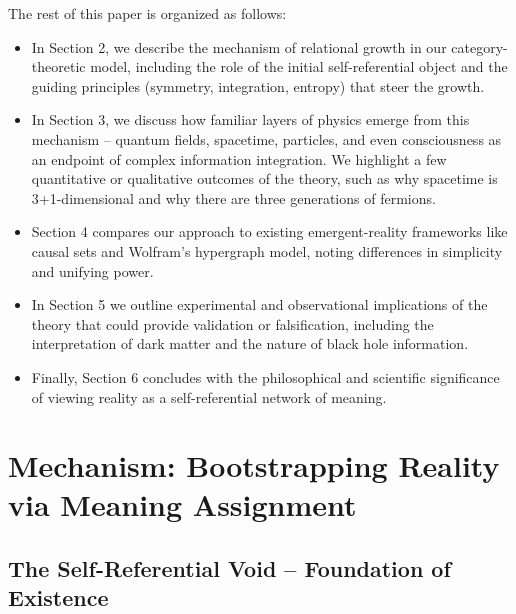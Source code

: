 \documentclass{article}
\begin{document}
The rest of this paper is organized as follows:
\begin{itemize}
\item In Section 2, we describe the mechanism of relational growth in our category-theoretic model, including the role of the initial self-referential object and the guiding principles (symmetry, integration, entropy) that steer the growth.
\item In Section 3, we discuss how familiar layers of physics emerge from this mechanism -- quantum fields, spacetime, particles, and even consciousness as an endpoint of complex information integration. We highlight a few quantitative or qualitative outcomes of the theory, such as why spacetime is 3+1-dimensional and why there are three generations of fermions.
\item Section 4 compares our approach to existing emergent-reality frameworks like causal sets and Wolfram’s hypergraph model, noting differences in simplicity and unifying power.
\item In Section 5 we outline experimental and observational implications of the theory that could provide validation or falsification, including the interpretation of dark matter and the nature of black hole information.
\item Finally, Section 6 concludes with the philosophical and scientific significance of viewing reality as a self-referential network of meaning.
\end{itemize}


\section{Mechanism: Bootstrapping Reality via Meaning Assignment}

\subsection{The Self-Referential Void – Foundation of Existence}
\end{document}
